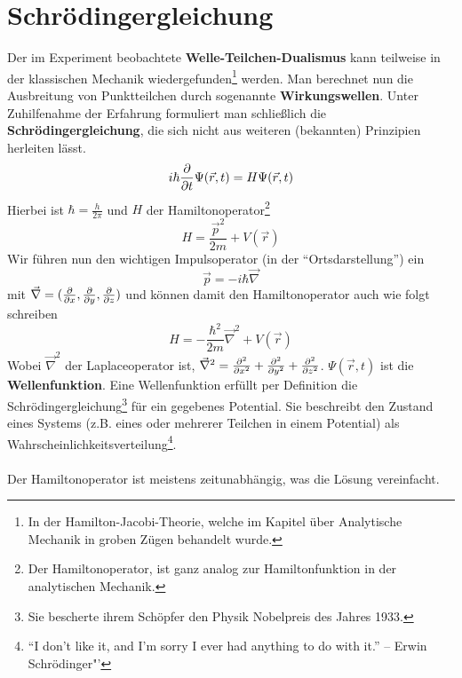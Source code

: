 \section{Schrödingergleichung}
Der im Experiment beobachtete \textbf{Welle-Teilchen-Dualismus} kann teilweise in der klassischen Mechanik wiedergefunden\footnote{In der Hamilton-Jacobi-Theorie, welche im Kapitel über Analytische Mechanik in groben Zügen behandelt wurde.} werden. Man berechnet nun die Ausbreitung von Punktteilchen durch sogenannte \textbf{Wirkungswellen}. Unter Zuhilfenahme der Erfahrung formuliert man schließlich die \textbf{Schrödingergleichung}, die sich nicht aus weiteren (bekannten) Prinzipien herleiten lässt.
$$i \hbar \frac{\partial}{\partial t} \Psi(\vec{r}, t) = H \Psi(\vec{r}, t)$$
Hierbei ist $\hbar = \frac{h}{2 \pi}$ und $H$ der Hamiltonoperator\footnote{Der Hamiltonoperator, ist ganz analog zur Hamiltonfunktion in der analytischen Mechanik.}
$$H = \frac{\vec{p}^2}{2m} + V(\vec{r})$$
Wir führen nun den wichtigen Impulsoperator (in der "`Ortsdarstellung"') ein
$$\vec{p} = - i \hbar \vec{\nabla}$$
mit $\vec{\nabla} = (\frac{\partial}{\partial x}, \frac{\partial}{\partial y}, \frac{\partial}{\partial z})$ und können damit den Hamiltonoperator auch wie folgt schreiben
$$H = - \frac{\hbar^2}{2m} \vec{\nabla}^2 + V(\vec{r})$$
Wobei $\vec{\nabla}^2$ der Laplaceoperator ist, $\vec{\nabla}^2 = \frac{\partial ^2}{\partial x^2} +\frac{\partial ^2}{\partial y^2} + \frac{\partial ^2}{\partial z^2}$.
$\Psi(\vec{r}, t)$ ist die \textbf{Wellenfunktion}. Eine Wellenfunktion erfüllt per Definition die Schrödingergleichung\footnote{Sie bescherte ihrem Schöpfer den Physik Nobelpreis des Jahres 1933.} für ein gegebenes Potential. Sie beschreibt den Zustand eines Systems (z.B. eines oder mehrerer Teilchen in einem Potential) als Wahrscheinlichkeitsverteilung\footnote{"`I don't like it, and I'm sorry I ever had anything to do with it."' – Erwin Schrödinger"'}. \\
~\\
Der Hamiltonoperator ist meistens zeitunabhängig, was die Lösung vereinfacht. 

